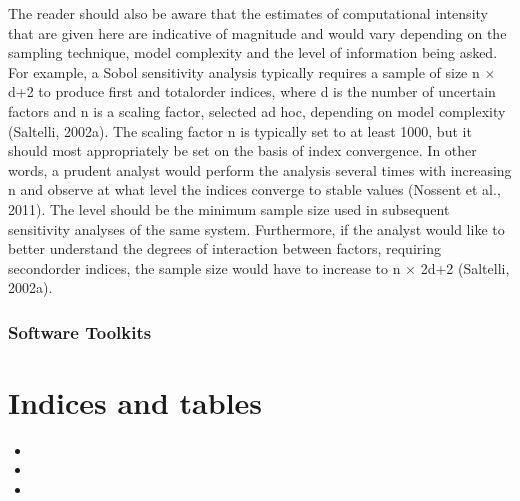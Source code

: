 \documentclass[letterpaper,10pt,english]{sphinxmanual}
\begin{document}
\sphinxAtStartPar
The reader should also be aware that the estimates of computational intensity that are given here are indicative of magnitude and would vary depending on the sampling technique, model complexity and the level of information being asked. For example, a Sobol sensitivity analysis typically requires a sample of size n × d+2 to produce first\sphinxhyphen{} and total\sphinxhyphen{}order indices, where d is the number of uncertain factors and n is a scaling factor, selected ad hoc, depending on model complexity (Saltelli, 2002a). The scaling factor n is typically set to at least 1000, but it should most appropriately be set on the basis of index convergence. In other words, a prudent analyst would perform the analysis several times with increasing n and observe at what level the indices converge to stable values (Nossent et al., 2011). The level should be the minimum sample size used in subsequent sensitivity analyses of the same system. Furthermore, if the analyst would like to better understand the degrees of interaction between factors, requiring second\sphinxhyphen{}order indices, the sample size would have to increase to n × 2d+2 (Saltelli, 2002a).


\subsection{Software Toolkits}
\label{\detokenize{3_sensitivity_analysis_the_basics:software-toolkits}}

\chapter{Indices and tables}
\label{\detokenize{index:indices-and-tables}}\begin{itemize}
\item {} 
\sphinxAtStartPar
{}

\item {} 
\sphinxAtStartPar
{}

\item {} 
\sphinxAtStartPar
{}

\end{itemize}



\renewcommand{\indexname}{Index}
\printindex
\end{document}
